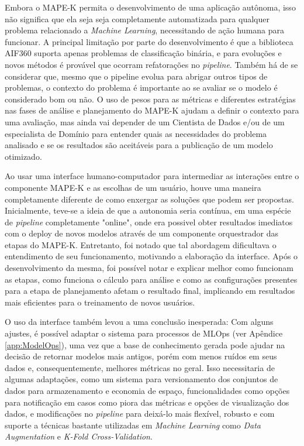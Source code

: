 \documentclass[portugues]{ic-tese}
\begin{document}
Embora o MAPE-K permita o desenvolvimento de uma aplicação autônoma, isso não significa que ela seja seja completamente automatizada para qualquer problema relacionado a \textit{Machine Learning}, necessitando de ação humana para funcionar. A principal limitação por parte do desenvolvimento é que a biblioteca AIF360 suporta apenas problemas de classificação binária, e para evoluções e novos métodos é provável que ocorram refatorações no \textit{pipeline}. Também há de se considerar que, mesmo que o pipeline evolua para abrigar outros tipos de problemas, o contexto do problema é importante ao se avaliar se o modelo é considerado bom ou não. O uso de pesos para as métricas e diferentes estratégias nas fases de análise e planejamento do MAPE-K ajudam a definir o contexto para uma avaliação, mas ainda vai depender de um Cientista de Dados e/ou de um especialista de Domínio para entender quais as necessidades do problema analisado e se os resultados são aceitáveis para a publicação de um modelo otimizado.

Ao usar uma interface humano-computador para intermediar as interações entre o componente MAPE-K e as escolhas de um usuário, houve uma maneira completamente diferente de como enxergar as soluções que podem ser propostas. Inicialmente, teve-se a ideia de que a autonomia seria contínua, em uma espécie de \textit{pipeline} completamente "online", onde era possivel obter resultados imediatos com o deploy de novos modelos através de um componente orquestrador das etapas do MAPE-K. Entretanto, foi notado que tal abordagem dificultava o entendimento de seu funcionamento, motivando a elaboração da interface. Após o desenvolvimento da mesma, foi possível notar e explicar melhor como funcionam as etapas, como funciona o cálculo para análise e como as configurações presentes para a etapa de planejamento afetam o resultado final, implicando em resultados mais eficientes para o treinamento de novos usuários.

O uso da interface também levou a uma conclusão inesperada: Com alguns ajustes, é possível adaptar o sistema para processos de MLOps (ver Apêndice \ref{app:ModelOps}), uma vez que a base de conhecimento gerada pode ajudar na decisão de retornar modelos mais antigos, porém com menos ruídos em seus dados e, consequentemente, melhores métricas no geral. Isso necessitaria de algumas adaptações, como um sistema para versionamento dos conjuntos de dados para armazenamento e economia de espaço, funcionalidades como opções para notificação em casos como piora das métricas e opções de visualização dos dados, e modificações no \textit{pipeline} para deixá-lo mais flexível, robusto e com suporte a técnicas bastante utilizadas em \textit{Machine Learning} como \textit{Data Augmentation} e \textit{K-Fold Cross-Validation}.
\end{document}
